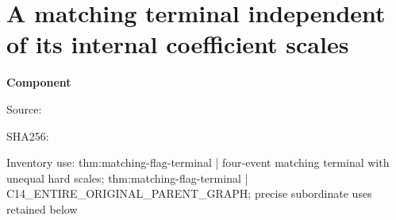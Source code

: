\chapter{A matching terminal independent of its internal coefficient scales}
\label{component:pa2cbe6ecbeb4}
\noindent\textbf{Component }\par
{\small\noindent Source: \par}
{\small\noindent SHA256: \par}
{\small\noindent Inventory use: thm:matching-flag-terminal | four-event matching terminal with unequal hard scales; thm:matching-flag-terminal | C14\_\allowbreak{}ENTIRE\_\allowbreak{}ORIGINAL\_\allowbreak{}PARENT\_\allowbreak{}GRAPH; precise subordinate uses retained below\par}
\medskip
